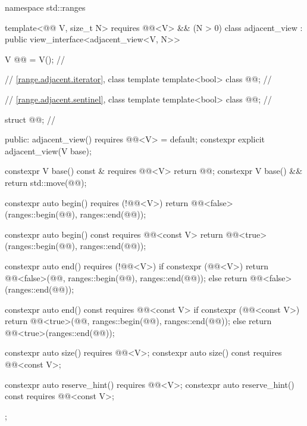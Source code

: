 %
%
%
\begin{codeblock}
namespace std::ranges {
  template<@@ V, size_t N>
    requires @@<V> && (N > 0)
  class adjacent_view : public view_interface<adjacent_view<V, N>> {
    V @@ = V();                      // \expos

    // \ref{range.adjacent.iterator}, class template 
    template<bool> class @@;      // \expos

    // \ref{range.adjacent.sentinel}, class template 
    template<bool> class @@;      // \expos

    struct @@{};               // \expos

  public:
    adjacent_view() requires @@<V> = default;
    constexpr explicit adjacent_view(V base);

    constexpr V base() const & requires @@<V> { return @@; }
    constexpr V base() && { return std::move(@@); }

    constexpr auto begin() requires (!@@<V>) {
      return @@<false>(ranges::begin(@@), ranges::end(@@));
    }

    constexpr auto begin() const requires @@<const V> {
      return @@<true>(ranges::begin(@@), ranges::end(@@));
    }

    constexpr auto end() requires (!@@<V>) {
      if constexpr (@@<V>) {
        return @@<false>(@@{}, ranges::begin(@@), ranges::end(@@));
      } else {
        return @@<false>(ranges::end(@@));
      }
    }

    constexpr auto end() const requires @@<const V> {
      if constexpr (@@<const V>) {
        return @@<true>(@@{}, ranges::begin(@@), ranges::end(@@));
      } else {
        return @@<true>(ranges::end(@@));
      }
    }

    constexpr auto size() requires @@<V>;
    constexpr auto size() const requires @@<const V>;

    constexpr auto reserve_hint() requires @@<V>;
    constexpr auto reserve_hint() const requires @@<const V>;
  };
}
\end{codeblock}

